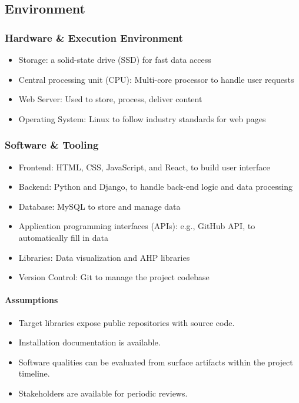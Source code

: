 \documentclass{article}
\begin{document}
\subsection{Environment}
\subsubsection{Hardware \& Execution Environment}

\begin{itemize}
    \item Storage: a solid-state drive (SSD) for fast data access
    \item Central processing unit (CPU): Multi-core processor to handle user requests
    \item Web Server: Used to store, process, deliver content
    \item Operating System: Linux to follow industry standards for web pages
\end{itemize}
\subsubsection{Software \& Tooling}
\begin{itemize}
    \item Frontend: HTML, CSS, JavaScript, and React, to build user interface
    \item Backend: Python and Django, to handle back-end logic and data processing
    \item Database: MySQL to store and manage data
    \item Application programming interfaces (APIs): e.g., GitHub API, to automatically fill in data
    \item Libraries: Data visualization and AHP libraries
    \item Version Control: Git to manage the project codebase
\end{itemize}

\paragraph{Assumptions}
\begin{itemize}
  \item Target libraries expose public repositories with source code.
  \item Installation documentation is available.
  \item Software qualities can be evaluated from surface artifacts within the project timeline.
  \item Stakeholders are available for periodic reviews.
\end{itemize}
\end{document}
